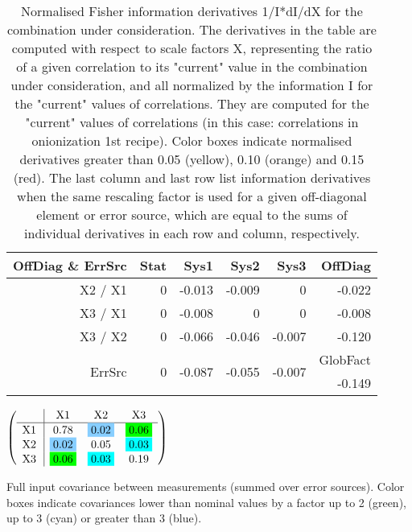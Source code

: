\begin{table}[H]
\scriptsize
\begin{center}
\renewcommand{\arraystretch}{1.1}
\begin{tabular}{|r|rrrr|r|}
\hline
 OffDiag \& ErrSrc & {\tiny Stat} & {\tiny Sys1} & {\tiny Sys2} & {\tiny Sys3} & OffDiag\\
\hline
X2 / X1 &  0 &     -0.013 &     -0.009 &  0 &     -0.022 \\
X3 / X1 &  0 &     -0.008 &  0 &  0 &     -0.008 \\
X3 / X2 &  0 &     -0.066 &     -0.046 &     -0.007 &     -0.120 \\
\hline
\multirow{2}{*}{ErrSrc} & \multirow{2}{*}{ 0} & \multirow{2}{*}{    -0.087} & \multirow{2}{*}{    -0.055} & \multirow{2}{*}{    -0.007} & GlobFact\\
 & & & & &     -0.149 \\
\hline
\end{tabular}
\renewcommand{\arraystretch}{1}
\caption{Normalised Fisher information derivatives 1/I*dI/dX for the combination under consideration. The derivatives in the table are computed with respect to scale factors X, representing the ratio of a given correlation to its "current" value in the combination under consideration, and all normalized by the information I for the "current" values of correlations. They are computed for the "current" values of correlations (in this case: correlations in onionization 1st recipe). Color boxes indicate normalised derivatives greater than 0.05 (yellow), 0.10 (orange) and 0.15 (red). The last column and last row list information derivatives when the same rescaling factor is used for a given off-diagonal element or error source, which are equal to the sums of individual derivatives in each row and column, respectively.}
\end{center}
\end{table}
\begin{table}[H]
\scriptsize
\begin{center}
\renewcommand{\arraystretch}{1.1}
\begin{math}\left(\begin{array}{c|ccc}
 & \mathrm{X1} & 
\mathrm{X2} & 
\mathrm{X3} \\
\hline
\mathrm{X1} \hspace*{2pt} &       0.78 &  \colorbox{SkyBlue1}{$      0.02$} &  \colorbox{Green1}{$      0.06$} \\
\mathrm{X2} \hspace*{2pt} &  \colorbox{SkyBlue1}{$      0.02$} &       0.05 &  \colorbox{Cyan1}{$      0.03$} \\
\mathrm{X3} \hspace*{2pt} &  \colorbox{Green1}{$      0.06$} &  \colorbox{Cyan1}{$      0.03$} &       0.19 \\
\end{array}\right)\end{math}
\caption{Full input covariance between measurements (summed over error sources). Color boxes indicate covariances lower than nominal values by a factor up to 2 (green), up to 3 (cyan) or greater than 3 (blue).}
\renewcommand{\arraystretch}{1}
\end{center}
\end{table}
